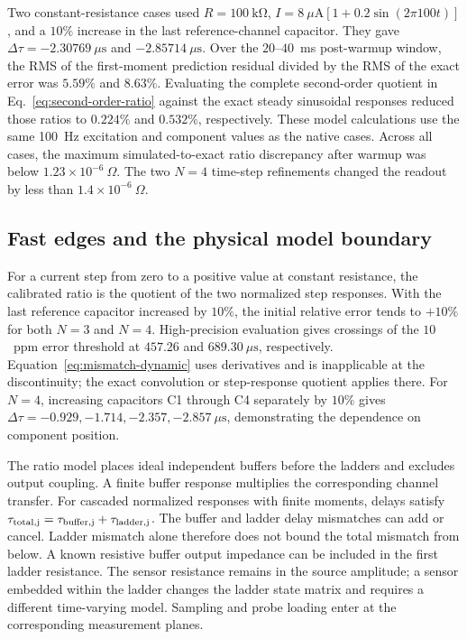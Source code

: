 Two constant-resistance cases used $R=100~\mathrm{k\Omega}$, $I=8~\mu\mathrm A[1+0.2\sin(2\pi100t)]$, and a $10\%$ increase in the last reference-channel capacitor. They gave $\Delta\tau=-2.30769~\mu\mathrm s$ and $-2.85714~\mu\mathrm s$. Over the $20$--$40$~ms post-warmup window, the RMS of the first-moment prediction residual divided by the RMS of the exact error was $5.59\%$ and $8.63\%$. Evaluating the complete second-order quotient in Eq.~\eqref{eq:second-order-ratio} against the exact steady sinusoidal responses reduced those ratios to $0.224\%$ and $0.532\%$, respectively. These model calculations use the same 100~Hz excitation and component values as the native cases. Across all cases, the maximum simulated-to-exact ratio discrepancy after warmup was below $1.23\times10^{-6}~\Omega$. The two $N=4$ time-step refinements changed the readout by less than $1.4\times10^{-6}~\Omega$.

\subsection{Fast edges and the physical model boundary}

For a current step from zero to a positive value at constant resistance, the calibrated ratio is the quotient of the two normalized step responses. With the last reference capacitor increased by $10\%$, the initial relative error tends to $+10\%$ for both $N=3$ and $N=4$. High-precision evaluation gives crossings of the $10$~ppm error threshold at $457.26$ and $689.30~\mu\mathrm s$, respectively. Equation~\eqref{eq:mismatch-dynamic} uses derivatives and is inapplicable at the discontinuity; the exact convolution or step-response quotient applies there. For $N=4$, increasing capacitors C1 through C4 separately by $10\%$ gives $\Delta\tau=-0.929,-1.714,-2.357,-2.857~\mu\mathrm s$, demonstrating the dependence on component position.

The ratio model places ideal independent buffers before the ladders and excludes output coupling. A finite buffer response multiplies the corresponding channel transfer. For cascaded normalized responses with finite moments, delays satisfy $\tau_{\rm total,j}=\tau_{\rm buffer,j}+\tau_{\rm ladder,j}$. The buffer and ladder delay mismatches can add or cancel. Ladder mismatch alone therefore does not bound the total mismatch from below. A known resistive buffer output impedance can be included in the first ladder resistance. The sensor resistance remains in the source amplitude; a sensor embedded within the ladder changes the ladder state matrix and requires a different time-varying model. Sampling and probe loading enter at the corresponding measurement planes.




\FloatBarrier
